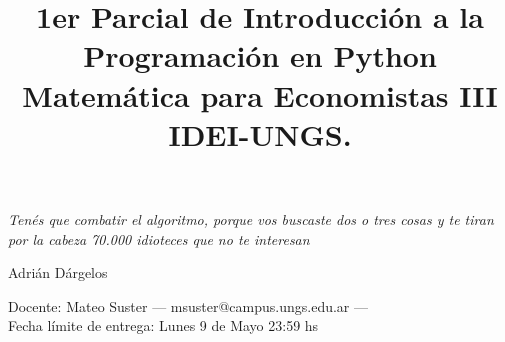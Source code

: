 \documentclass[a4paper,11pt]{article}
\title{1er Parcial de Introducción a la Programación en Python\\ Matemática para Economistas III \\ IDEI-UNGS.}
\begin{document}
\maketitle
\epigraph{\itshape Tenés que combatir el algoritmo, porque vos buscaste dos o tres cosas y te tiran por la cabeza 70.000 idioteces que no te interesan}{Adrián Dárgelos }	

\noindent Docente: Mateo Suster --- msuster@campus.ungs.edu.ar --- \\
Fecha límite de entrega: Lunes 9 de Mayo 23:59 hs

\end{document}
